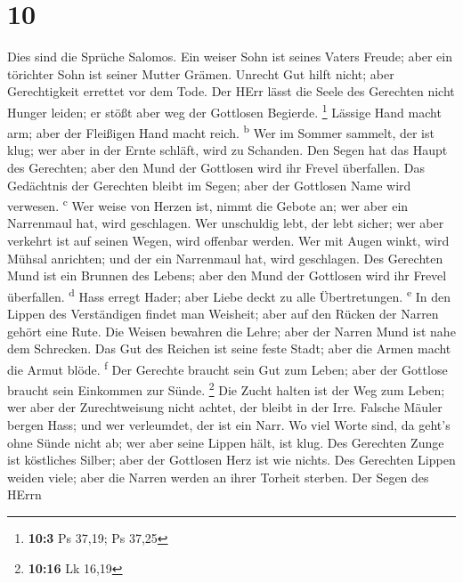 \hypertarget{section-9}{%
\section{10}\label{section-9}}

 Dies sind die Sprüche Salomos. Ein weiser Sohn ist seines
Vaters Freude; aber ein törichter Sohn ist seiner Mutter Grämen.
 Unrecht Gut hilft nicht; aber Gerechtigkeit errettet vor
dem Tode.  Der HErr lässt die Seele des Gerechten nicht
Hunger leiden; er stößt aber weg der Gottlosen Begierde. \footnote{\textbf{10:3}
  Ps 37,19; Ps 37,25}  Lässige Hand macht arm; aber der
Fleißigen Hand macht reich. \textsuperscript{b}  Wer im
Sommer sammelt, der ist klug; wer aber in der Ernte schläft, wird zu
Schanden.  Den Segen hat das Haupt des Gerechten; aber den
Mund der Gottlosen wird ihr Frevel überfallen.  Das
Gedächtnis der Gerechten bleibt im Segen; aber der Gottlosen Name wird
verwesen. \textsuperscript{c}  Wer weise von Herzen ist,
nimmt die Gebote an; wer aber ein Narrenmaul hat, wird geschlagen.
 Wer unschuldig lebt, der lebt sicher; wer aber verkehrt
ist auf seinen Wegen, wird offenbar werden.  Wer mit
Augen winkt, wird Mühsal anrichten; und der ein Narrenmaul hat, wird
geschlagen.  Des Gerechten Mund ist ein Brunnen des
Lebens; aber den Mund der Gottlosen wird ihr Frevel überfallen.
\textsuperscript{d}  Hass erregt Hader; aber Liebe deckt
zu alle Übertretungen. \textsuperscript{e}  In den Lippen
des Verständigen findet man Weisheit; aber auf den Rücken der Narren
gehört eine Rute.  Die Weisen bewahren die Lehre; aber
der Narren Mund ist nahe dem Schrecken.  Das Gut des
Reichen ist seine feste Stadt; aber die Armen macht die Armut blöde.
\textsuperscript{f}  Der Gerechte braucht sein Gut zum
Leben; aber der Gottlose braucht sein Einkommen zur Sünde. \footnote{\textbf{10:16}
  Lk 16,19}  Die Zucht halten ist der Weg zum Leben; wer
aber der Zurechtweisung nicht achtet, der bleibt in der Irre.
 Falsche Mäuler bergen Hass; und wer verleumdet, der ist
ein Narr.  Wo viel Worte sind, da geht's ohne Sünde nicht
ab; wer aber seine Lippen hält, ist klug.  Des Gerechten
Zunge ist köstliches Silber; aber der Gottlosen Herz ist wie nichts.
 Des Gerechten Lippen weiden viele; aber die Narren
werden an ihrer Torheit sterben.  Der Segen des HErrn
